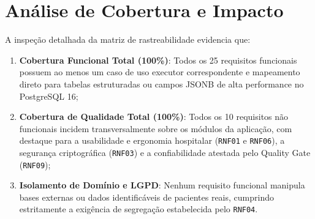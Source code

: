 \section{Análise de Cobertura e Impacto}
\label{sec_analise_cobertura}

A inspeção detalhada da matriz de rastreabilidade evidencia que:
\begin{enumerate}
    \item \textbf{Cobertura Funcional Total (100\%)}: Todos os 25 requisitos funcionais possuem ao menos um caso de uso executor correspondente e mapeamento direto para tabelas estruturadas ou campos JSONB de alta performance no PostgreSQL 16;
    \item \textbf{Cobertura de Qualidade Total (100\%)}: Todos os 10 requisitos não funcionais incidem transversalmente sobre os módulos da aplicação, com destaque para a usabilidade e ergonomia hospitalar (\texttt{RNF01} e \texttt{RNF06}), a segurança criptográfica (\texttt{RNF03}) e a confiabilidade atestada pelo Quality Gate (\texttt{RNF09});
    \item \textbf{Isolamento de Domínio e LGPD}: Nenhum requisito funcional manipula bases externas ou dados identificáveis de pacientes reais, cumprindo estritamente a exigência de segregação estabelecida pelo \texttt{RNF04}.
\end{enumerate}
